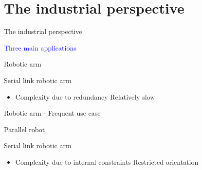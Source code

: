 \documentclass[usenames,dvipsnames,xcolor=table]{beamer}
\begin{document}



\section{The industrial perspective}
\begin{frame}{The industrial perspective}
\begin{center}
    \Large{\textcolor{blue}{Three main applications}}
    \def\svgwidth{\linewidth}
    
\end{center}
\end{frame}

\begin{frame}{Robotic arm}
    \begin{center}
        \begin{minipage}{0.49\linewidth}
                \def\svgwidth{\linewidth}
                
        \end{minipage}
        \hfill
        \begin{minipage}{0.49\linewidth}
        \large{Serial link robotic arm}
        \begin{itemize}
            \pro Large work-space
            \pro Versatility
            \item[]
            \con Complexity due to redundancy
            \con Relatively slow
        \end{itemize}
        \end{minipage}
    \end{center}
\end{frame}

\begin{frame}{Robotic arm - Frequent use case}
    \begin{center}
    \end{center}
\end{frame}
\begin{frame}{Parallel robot}
    \begin{center}
        \begin{minipage}{0.49\linewidth}
                \def\svgwidth{\linewidth}
                
        \end{minipage}
        \hfill
        \begin{minipage}{0.49\linewidth}
        \large{Serial link robotic arm}
        \begin{itemize}
            \pro Speed \& precision
            \pro Large 	work-space
            \item[]
            \con Complexity due to internal constraints
            \con Restricted orientation
        \end{itemize}
        \end{minipage}
    \end{center}
\end{frame}
\end{document}
